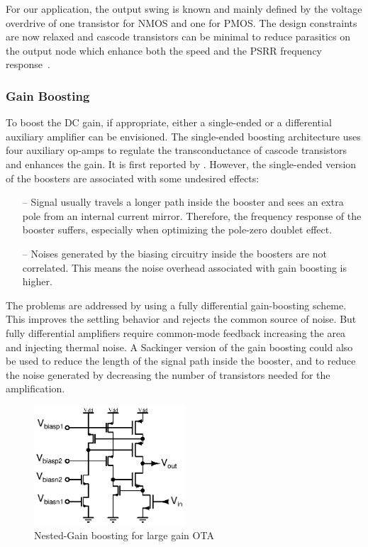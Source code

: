 For our application, the output swing is known and mainly defined by the voltage overdrive of one transistor for NMOS and one for PMOS\@. The design constraints are now relaxed and cascode transistors can be minimal to reduce parasitics on the output node which enhance both the speed and the PSRR frequency response~\cite{Ribner1984}.

\subsubsection{Gain Boosting}
To boost the DC gain, if appropriate, either a single-ended or a differential auxiliary amplifier can be envisioned. The single-ended boosting architecture uses four auxiliary op-amps to regulate the transconductance of cascode transistors and enhances the gain. It is first reported by \cite{Bult1990}. However, the single-ended version of the boosters are associated with some undesired effects:
\begin{itemize}
    \itemsep-0.5em
    \item[--] Signal usually travels a longer path inside the booster and sees an extra pole from an internal current mirror. Therefore, the frequency response of the booster suffers, especially when optimizing the pole-zero doublet effect.
    \item[--] Noises generated by the biasing circuitry inside the boosters are not correlated. This means the noise overhead associated with gain boosting is higher.
\end{itemize}
The problems are addressed by using a fully differential gain-boosting scheme. This improves the settling behavior and rejects the common source of noise. But fully differential amplifiers require common-mode feedback increasing the area and injecting thermal noise. A Sackinger version of the gain boosting could also be used to reduce the length of the signal path inside the booster, and to reduce the noise generated by decreasing the number of transistors needed for the amplification.

\begin{figure}[htp]
    \centering
    \includegraphics[width=0.5\textwidth]{Chapter7/Figs/gain-boosting.ps}
    \caption{Nested-Gain boosting for large gain OTA}
    \label{fig:nmos-nested-gain-boosting}
\end{figure}

